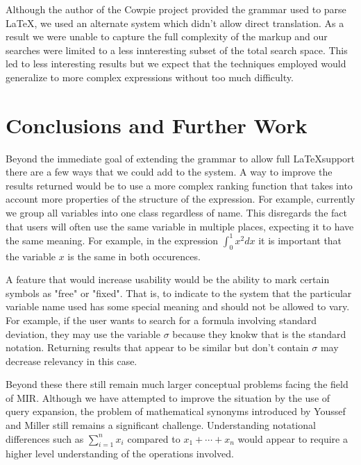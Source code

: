 \documentclass{sig-alternate}
\begin{document}
Although the author of the Cowpie project provided the grammar used to parse \LaTeX, we used an alternate system
which didn't allow direct translation. As a result we were unable to capture the full complexity of the markup and 
our searches were limited to a less innteresting subset of the total search space. This led to less interesting results
but we expect that the techniques employed would generalize to more complex expressions without too much difficulty.

\section{Conclusions and Further Work}
Beyond the immediate goal of extending the grammar to allow full \LaTeX support there are a few ways that we could 
add to the system. A way to improve the results returned would be to use a more complex ranking function that takes into
account more properties of the structure of the expression. For example, currently we group all variables into one
class regardless of name. This disregards the fact that users will often use the same variable in multiple places, 
expecting it to have the same meaning. For example, in the expression $\int_{0}^{1}x^{2} dx$ it is important that
the variable $x$ is the same in both occurences. 

A feature that would increase usability would be the ability to mark certain symbols as "free" or "fixed". That is, to
indicate to the system that the particular variable name used has some special meaning and should not be allowed
to vary. For example, if the user wants to search for a formula involving standard deviation, they may use the
variable $\sigma$ because they knokw that is the standard notation. Returning results that appear to be similar but don't
contain $\sigma$ may decrease relevancy in this case.

Beyond these there still remain much larger conceptual problems facing the field of MIR. Although we have attempted to
improve the situation by the use of query expansion, the problem of mathematical synonyms introduced by Youssef and Miller still remains a significant challenge. Understanding notational differences such as $\sum_{i=1}^{n}x_i$ compared to
$x_1 + \cdots + x_n$ would appear to require a higher level understanding of the operations involved. 

%

\end{document}
